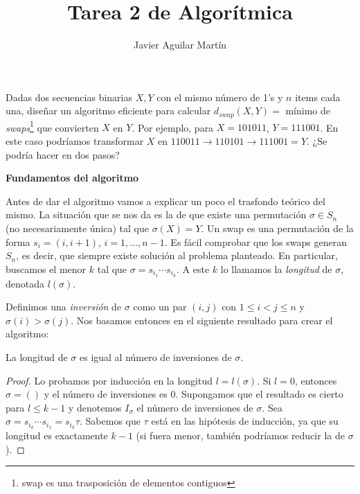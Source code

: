 \documentclass[twoside]{article}
\begin{document}
\title{Tarea 2 de Algorítmica}
\author{Javier Aguilar Martín}
\maketitle


\begin{ejercicio}{1}
Dadas dos secuencias binarias $X,Y$ con el mismo número de 1's y $n$ items cada una, diseñar un algoritmo eficiente para calcular $d_{swap}(X,Y)=$ mínimo de \emph{swaps}\footnote{swap es una trasposición de elementos contiguos} que convierten $X$ en $Y$. Por ejemplo, para $X=101011$, $Y=111001$. En este caso podríamos transformar $X$ en $110011\to 110101\to 111001=Y$. ¿Se podría hacer en dos pasos?
\end{ejercicio}
\begin{solucion}

\textbf{Fundamentos del algoritmo}

Antes de dar el algoritmo vamos a explicar un poco el trasfondo teórico del mismo. La situación que se nos da es la de que existe una permutación $\sigma\in S_n$ (no necesariamente única) tal que $\sigma(X)=Y$. Un swap es una permutación de la forma $s_i=(i, i+1)$, $i=1,\dots, n-1$. Es fácil comprobar que los swaps generan $S_n$, es decir, que siempre existe solución al problema planteado. En particular, buscamos el menor $k$ tal que $\sigma=s_{i_1}\cdots s_{i_k}$. A este $k$ lo llamamos la \emph{longitud} de $\sigma$, denotada $l(\sigma)$. 

Definimos una \emph{inversión} de $\sigma$ como un par $(i,j)$ con $1\leq i<j\leq n$ y $\sigma(i)>\sigma(j)$. Nos basamos entonces en el siguiente resultado para crear el algoritmo:

\begin{lemma}
La longitud de $\sigma$ es igual al número de inversiones de $\sigma$. 
\end{lemma}
\begin{proof}
Lo probamos por inducción en la longitud $l=l(\sigma)$. Si $l=0$, entonces $\sigma=()$ y el número de inversiones es 0. Supongamos que el resultado es cierto para $l\leq k-1$ y denotemos $I_{\sigma}$ el número de inversiones de $\sigma$. Sea $\sigma=s_{i_k}\cdots s_{i_1}=s_{i_k}\tau$. Sabemos que $\tau$ está en las hipótesis de inducción, ya que su longitud es exactamente $k-1$ (si fuera menor, también podríamos reducir la de $\sigma$). 


\end{proof}
\end{solucion}
\end{document}
